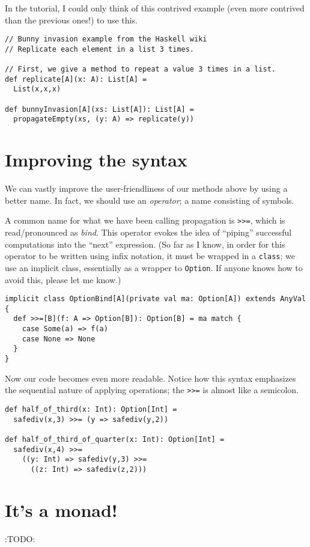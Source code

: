 \documentclass[11pt]{article}
\begin{document}
In the tutorial, I could only think of this contrived example
(even more contrived than the previous ones!)
to use this.
\begin{verbatim}
// Bunny invasion example from the Haskell wiki
// Replicate each element in a list 3 times.

// First, we give a method to repeat a value 3 times in a list.
def replicate[A](x: A): List[A] =
  List(x,x,x)

def bunnyInvasion[A](xs: List[A]): List[A] =
  propagateEmpty(xs, (y: A) => replicate(y))
\end{verbatim}

\section{Improving the syntax}
\label{sec:orgd2a2046}
We can vastly improve the user-friendliness of our
methods above by using a better name.
In fact, we should use an \emph{operator}; a name consisting of symbols.

A common name for what we have been calling
propagation is \texttt{>>=}, which is read/pronounced as \emph{bind}.
This operator evokes the idea of “piping” successful computations
into the “next” expression.
(So far as I know, in order for this operator to be written
 using infix notation, it must be wrapped in a \texttt{class};
 we use an implicit class, essentially as a wrapper to \texttt{Option}.
 If anyone knows how to avoid this, please let me know.)
\begin{verbatim}
implicit class OptionBind[A](private val ma: Option[A]) extends AnyVal {
  def >>=[B](f: A => Option[B]): Option[B] = ma match {
    case Some(a) => f(a)
    case None => None
  }
}
\end{verbatim}

Now our code becomes even more readable.
Notice how this syntax emphasizes the sequential nature
of applying operations; the \texttt{>>=} is almost like a semicolon.
\begin{verbatim}
def half_of_third(x: Int): Option[Int] =
  safediv(x,3) >>= (y => safediv(y,2))

def half_of_third_of_quarter(x: Int): Option[Int] =
  safediv(x,4) >>=
    ((y: Int) => safediv(y,3) >>=
      ((z: Int) => safediv(z,2)))
\end{verbatim}

\section{It's a monad!}
\label{sec:org3ae5971}
:TODO:
\end{document}
